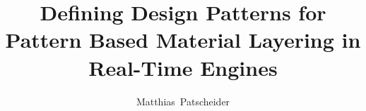 \documentclass[master,english]{hgbthesis}
\title{Defining Design Patterns for Pattern Based Material Layering in Real-Time Engines}
\author{Matthias\ Patscheider}
\begin{document}

\frontmatter							%

\maketitle
\tableofcontents




\mainmatter          			%



%




\appendix                                         %


\MakeBibliography                        				%
 
%

\end{document}
